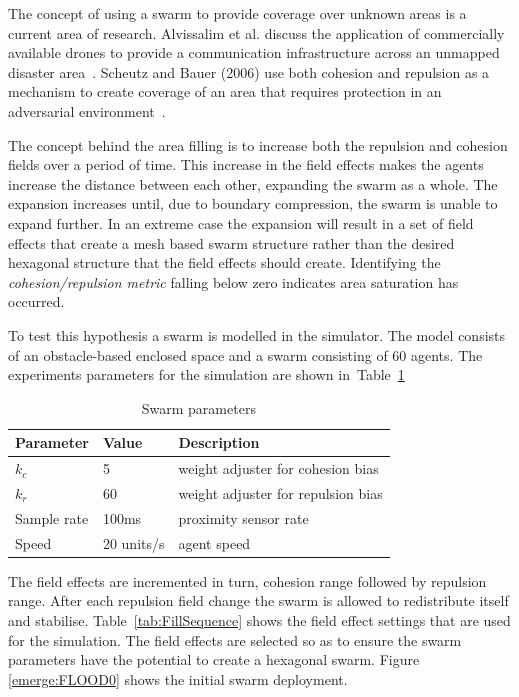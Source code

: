 \documentclass{ieeeaccess}
\begin{document}
The concept of using a swarm to provide coverage over unknown areas is a current area of research. Alvissalim et al. discuss the application of commercially available drones to provide a communication infrastructure across an unmapped disaster area~\cite{AZHMJJM:12}. Scheutz and Bauer (2006) use both cohesion and repulsion as a mechanism to create coverage of an area that requires protection in an adversarial environment~\cite{SB:06}.

The concept behind the area filling is to increase both the repulsion and cohesion fields over a period of time. This increase in the field effects makes the agents increase the distance between each other, expanding the swarm as a whole. The expansion increases until, due to boundary compression, the swarm is unable to expand further. In an extreme case the expansion will result in a set of field effects that create a mesh based swarm structure rather than the desired hexagonal structure that the field effects should create. Identifying the \textit{cohesion/repulsion metric} falling below zero indicates area saturation has occurred.

To test this hypothesis a swarm is modelled in the simulator. The model consists of an obstacle-based enclosed space and a swarm consisting of 60 agents. The experiments parameters for the simulation are shown in~Table~\ref{tab:FillParameters1}

\begin{table}[H]
\begin{center}
\begin{tabular}{| p{1.8cm} | p{1.5cm} | p{4.0cm} |}
\hline
\bf Parameter & \bf Value  & \bf Description \\ \hline
$k_c$         & 5          & weight adjuster for cohesion bias\\ \hline
$k_r$         & 60         & weight adjuster for repulsion bias\\ \hline
Sample rate   & 100ms      & proximity sensor rate\\ \hline
Speed         & 20 units/s & agent speed\\ \hline
\end{tabular}\caption{Swarm parameters} \label{tab:FillParameters1}
\end{center}
\end{table}

The field effects are incremented in turn, cohesion range followed by repulsion range. After each repulsion field change the swarm is allowed to redistribute itself and stabilise. Table~\ref{tab:FillSequence} shows the field effect settings that are used for the simulation. The field effects are selected so as to ensure the swarm parameters have the potential to create a hexagonal swarm. Figure \ref{emerge:FLOOD0} shows the initial swarm deployment.
\end{document}
